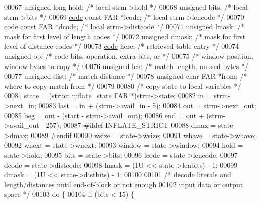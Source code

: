\begin{DoxyCode}
{00067     \textcolor{keywordtype}{unsigned} \textcolor{keywordtype}{long} hold;         \textcolor{comment}{/* local strm->hold */}
00068     \textcolor{keywordtype}{unsigned} bits;              \textcolor{comment}{/* local strm->bits */}
00069     \hyperlink{structcode}{code} \textcolor{keyword}{const} FAR *lcode;      \textcolor{comment}{/* local strm->lencode */}
00070     \hyperlink{structcode}{code} \textcolor{keyword}{const} FAR *dcode;      \textcolor{comment}{/* local strm->distcode */}
00071     \textcolor{keywordtype}{unsigned} lmask;             \textcolor{comment}{/* mask for first level of length codes */}
00072     \textcolor{keywordtype}{unsigned} dmask;             \textcolor{comment}{/* mask for first level of distance codes */}
00073     \hyperlink{structcode}{code} here;                  \textcolor{comment}{/* retrieved table entry */}
00074     \textcolor{keywordtype}{unsigned} op;                \textcolor{comment}{/* code bits, operation, extra bits, or */}
00075                                 \textcolor{comment}{/*  window position, window bytes to copy */}
00076     \textcolor{keywordtype}{unsigned} len;               \textcolor{comment}{/* match length, unused bytes */}
00077     \textcolor{keywordtype}{unsigned} dist;              \textcolor{comment}{/* match distance */}
00078     \textcolor{keywordtype}{unsigned} \textcolor{keywordtype}{char} FAR *from;    \textcolor{comment}{/* where to copy match from */}
00079 
00080     \textcolor{comment}{/* copy state to local variables */}
00081     state = (\textcolor{keyword}{struct }\hyperlink{structinflate__state}{inflate\_state} FAR *)strm->state;
00082     in = strm->next\_in;
00083     last = in + (strm->avail\_in - 5);
00084     out = strm->next\_out;
00085     beg = out - (start - strm->avail\_out);
00086     end = out + (strm->avail\_out - 257);
00087 \textcolor{preprocessor}{#ifdef INFLATE\_STRICT}
00088     dmax = state->dmax;
00089 \textcolor{preprocessor}{#endif}
00090     wsize = state->wsize;
00091     whave = state->whave;
00092     wnext = state->wnext;
00093     window = state->window;
00094     hold = state->hold;
00095     bits = state->bits;
00096     lcode = state->lencode;
00097     dcode = state->distcode;
00098     lmask = (1U << state->lenbits) - 1;
00099     dmask = (1U << state->distbits) - 1;
00100 
00101     \textcolor{comment}{/* decode literals and length/distances until end-of-block or not enough}
00102 \textcolor{comment}{       input data or output space */}
00103     \textcolor{keywordflow}{do} \{
00104         \textcolor{keywordflow}{if} (bits < 15) \{
}
\end{DoxyCode}
